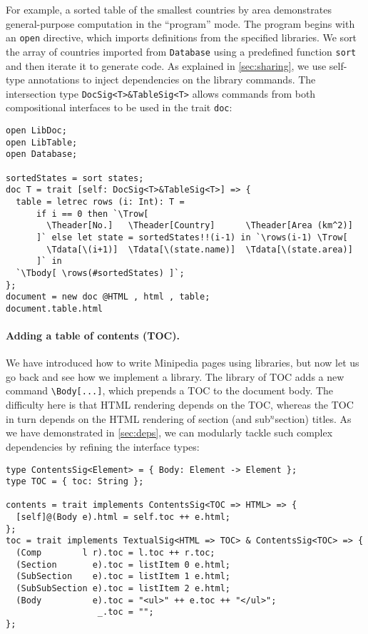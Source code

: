 For example, a sorted table of the smallest countries by area demonstrates
general-purpose computation in the ``program'' mode. The program begins with an
\lstinline{open} directive, which imports definitions from the specified
libraries. We sort the array of countries imported from \lstinline{Database}
using a predefined function \lstinline{sort} and then iterate it to generate
\ExT code. As explained in \autoref{sec:sharing}, we use self-type annotations
to inject dependencies on the library commands. The intersection type
\lstinline{DocSig<T>&TableSig<T>} allows \ExT commands from both compositional
interfaces to be used in the trait \lstinline{doc}:

\begin{lstlisting}
open LibDoc;
open LibTable;
open Database;

sortedStates = sort states;
doc T = trait [self: DocSig<T>&TableSig<T>] => {
  table = letrec rows (i: Int): T =
      if i == 0 then `\Trow[
        \Theader[No.]   \Theader[Country]      \Theader[Area (km^2)]
      ]` else let state = sortedStates!!(i-1) in `\rows(i-1) \Trow[
        \Tdata[\(i+1)]  \Tdata[\(state.name)]  \Tdata[\(state.area)]
      ]` in
  `\Tbody[ \rows(#sortedStates) ]`;
};
document = new doc @HTML , html , table;
document.table.html
\end{lstlisting}

\paragraph{Adding a table of contents (TOC).}
We have introduced how to write Minipedia pages using \ExT libraries, but now
let us go back and see how we implement a \ExT library. The library of TOC adds
a new command \lstinline{\Body[...]}, which prepends a TOC to the document body.
The difficulty here is that HTML rendering depends on the TOC, whereas the TOC
in turn depends on the HTML rendering of section (and sub$^n$section) titles. As
we have demonstrated in \autoref{sec:deps}, we can modularly tackle such complex
dependencies by refining the interface types:

\begin{lstlisting}
type ContentsSig<Element> = { Body: Element -> Element };
type TOC = { toc: String };

contents = trait implements ContentsSig<TOC => HTML> => {
  [self]@(Body e).html = self.toc ++ e.html;
};
toc = trait implements TextualSig<HTML => TOC> & ContentsSig<TOC> => {
  (Comp        l r).toc = l.toc ++ r.toc;
  (Section       e).toc = listItem 0 e.html;
  (SubSection    e).toc = listItem 1 e.html;
  (SubSubSection e).toc = listItem 2 e.html;
  (Body          e).toc = "<ul>" ++ e.toc ++ "</ul>";
                  _.toc = "";
};
\end{lstlisting}

